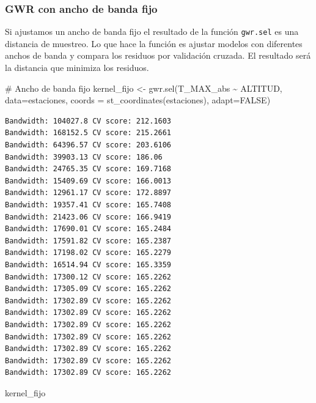 \documentclass[
  letterpaper,
  DIV=11,
  numbers=noendperiod]{scrreprt}
\newenvironment{Shaded}{\begin{snugshade}}{\end{snugshade}}
\newcommand{\AttributeTok}[1]{\textcolor[rgb]{0.40,0.45,0.13}{#1}}
\newcommand{\CommentTok}[1]{\textcolor[rgb]{0.37,0.37,0.37}{#1}}
\newcommand{\ConstantTok}[1]{\textcolor[rgb]{0.56,0.35,0.01}{#1}}
\newcommand{\FunctionTok}[1]{\textcolor[rgb]{0.28,0.35,0.67}{#1}}
\newcommand{\NormalTok}[1]{\textcolor[rgb]{0.00,0.23,0.31}{#1}}
\newcommand{\OtherTok}[1]{\textcolor[rgb]{0.00,0.23,0.31}{#1}}
\newcommand{\SpecialCharTok}[1]{\textcolor[rgb]{0.37,0.37,0.37}{#1}}
\begin{document}
\hypertarget{gwr-con-ancho-de-banda-fijo}{%
\subsubsection{GWR con ancho de banda
fijo}\label{gwr-con-ancho-de-banda-fijo}}

Si ajustamos un ancho de banda fijo el resultado de la función
\texttt{gwr.sel} es una distancia de muestreo. Lo que hace la función es
ajustar modelos con diferentes anchos de banda y compara los residuos
por validación cruzada. El resultado será la distancia que minimiza los
residuos.

\begin{Shaded}
\begin{Highlighting}[]
\CommentTok{\# Ancho de banda fijo}
\NormalTok{kernel\_fijo }\OtherTok{\textless{}{-}} \FunctionTok{gwr.sel}\NormalTok{(T\_MAX\_abs }\SpecialCharTok{\textasciitilde{}}\NormalTok{ ALTITUD, }\AttributeTok{data=}\NormalTok{estaciones, }\AttributeTok{coords =} \FunctionTok{st\_coordinates}\NormalTok{(estaciones), }\AttributeTok{adapt=}\ConstantTok{FALSE}\NormalTok{) }
\end{Highlighting}
\end{Shaded}

\begin{verbatim}
Bandwidth: 104027.8 CV score: 212.1603 
Bandwidth: 168152.5 CV score: 215.2661 
Bandwidth: 64396.57 CV score: 203.6106 
Bandwidth: 39903.13 CV score: 186.06 
Bandwidth: 24765.35 CV score: 169.7168 
Bandwidth: 15409.69 CV score: 166.0013 
Bandwidth: 12961.17 CV score: 172.8897 
Bandwidth: 19357.41 CV score: 165.7408 
Bandwidth: 21423.06 CV score: 166.9419 
Bandwidth: 17690.01 CV score: 165.2484 
Bandwidth: 17591.82 CV score: 165.2387 
Bandwidth: 17198.02 CV score: 165.2279 
Bandwidth: 16514.94 CV score: 165.3359 
Bandwidth: 17300.12 CV score: 165.2262 
Bandwidth: 17305.09 CV score: 165.2262 
Bandwidth: 17302.89 CV score: 165.2262 
Bandwidth: 17302.89 CV score: 165.2262 
Bandwidth: 17302.89 CV score: 165.2262 
Bandwidth: 17302.89 CV score: 165.2262 
Bandwidth: 17302.89 CV score: 165.2262 
Bandwidth: 17302.89 CV score: 165.2262 
Bandwidth: 17302.89 CV score: 165.2262 
\end{verbatim}

\begin{Shaded}
\begin{Highlighting}[]
\NormalTok{kernel\_fijo}
\end{Highlighting}
\end{Shaded}
\end{document}
